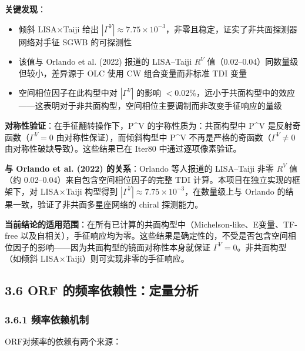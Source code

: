 \documentclass[12pt,a4paper]{article}
\begin{document}
\textbf{关键发现}：
\begin{itemize}
  \item 倾斜 LISA×Taiji 给出 $|\Gamma^V| \approx 7.75\times 10^{-3}$，非零且稳定，证实了非共面探测器网络对手征 SGWB 的可探测性
  \item 该值与 Orlando et al. (2022) 报道的 LISA–Taiji $R^V$ 值（$0.02$–$0.04$）同数量级但较小，差异源于 OLC 使用 CW 组合变量而非标准 TDI 变量
  \item 空间相位因子在此构型中对 $|\Gamma^V|$ 的影响 $< 0.02\%$，远小于共面构型中的效应——这表明对于非共面构型，空间相位主要调制而非改变手征响应的量级
\end{itemize}

\textbf{对称性验证}：在手征翻转操作下，P^V 的宇称性质为：共面构型中 P^V 是反射奇函数（$\Gamma^V = 0$ 由对称性保证），而倾斜构型中 P^V 不再是严格的奇函数（$\Gamma^V \neq 0$ 由对称性破缺导致）。这些结果已在 Iter80 中通过逐项像素验证。

\textbf{与 Orlando et al. (2022) 的关系}：Orlando 等人报道的 LISA–Taiji 非零 $R^V$ 值（约 0.02–0.04）来自包含空间相位因子的完整 TDI 计算。本项目在独立实现的框架下，对 LISA×Taiji 构型得到 $|\Gamma^V| \approx 7.75\times 10^{-3}$，在数量级上与 Orlando 的结果一致，验证了非共面多星座网络的 chiral 探测能力。

\textbf{当前结论的适用范围}：在所有已计算的共面构型中（Michelson-like、E变量、TF-free 以及自相关），手征响应均为零。这些结果是确定性的，不受是否包含空间相位因子的影响——因为共面构型的镜面对称性本身就保证 $\Gamma^V = 0$。非共面构型（如倾斜 LISA×Taiji）则可实现非零的手征响应。

\subsection{3.6 ORF 的频率依赖性：定量分析}


\subsubsection{3.6.1 频率依赖机制}


ORF对频率的依赖有两个来源：
\end{document}
